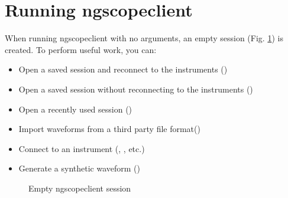 \section{Running ngscopeclient}

When running ngscopeclient with no arguments, an empty session (Fig. \ref{empty-window}) is created. To perform useful
work, you can:
\begin{itemize}
\item Open a saved session and reconnect to the instruments ()
\item Open a saved session without reconnecting to the instruments ()
\item Open a recently used session ()
\item Import waveforms from a third party file format()
\item Connect to an instrument (, , etc.)
\item Generate a synthetic waveform ()
\end{itemize}

\begin{figure}[h]
\centering
\caption{Empty ngscopeclient session}
\label{empty-window}
\end{figure}

